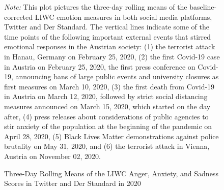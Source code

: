 \documentclass[
  english,
  jou,floatsintext]{apa7}
\begin{document}
\begin{figure}
\caption{Three-Day Rolling Means of the LIWC Anger, Anxiety, and Sadness Scores in Twitter and Der Standard in 2020 \label{fig:survey-plot-4}}

\newline{}

\textit{Note:} This plot pictures the three-day rolling means of the baseline-corrected LIWC emotion measures in both social media platforms, Twitter and Der Standard. The vertical lines indicate some of the time points of the following important external events that stirred emotional responses in the Austrian society: (1) the terrorist attack in Hanau, Germany on February 25, 2020, (2) the first Covid-19 case in Austria on February 25, 2020, the first press conference on Covid-19, announcing bans of large public events and university closures as first measures on March 10, 2020, (3) the first death from Covid-19 in Austria on March 12, 2020, followed by strict social distancing measures announced on March 15, 2020, which started on the day after, (4) press releases about considerations of public agencies to stir anxiety of the population at the beginning of the pandemic on April 28, 2020, (5) Black Lives Matter demonstrations against police brutality on May 31, 2020, and (6) the terrorist attack in Vienna, Austria on November 02, 2020.
\end{figure}
\end{document}
